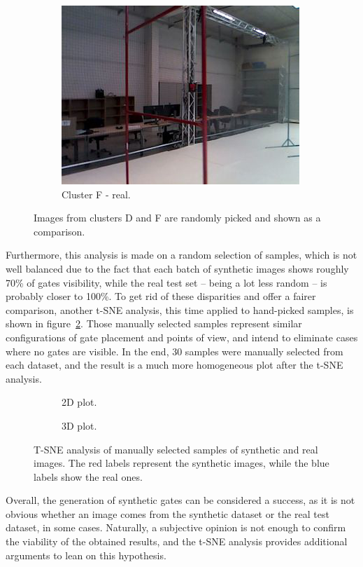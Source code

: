 \begin{figure}[h!]
\begin{subfigure}{0.32\textwidth}
      \includegraphics[width=\textwidth]{figure/tsne_random/F/6.png}
      \caption{Cluster F - real.}
   \end{subfigure}
   \caption[Synthetic versus real images comparison]{Images from clusters D and
   F are randomly picked and shown as a comparison.}
   \label{fig:clustering}
\end{figure}

Furthermore, this analysis is made on a random selection of samples, which is
not well balanced due to the fact that each batch of synthetic images shows
roughly 70\% of gates visibility, while the real test set -- being a lot less
random -- is probably closer to 100\%. To get rid of these disparities and
offer a fairer comparison, another t-SNE analysis, this time applied to
hand-picked samples, is shown in figure~\ref{fig:tsne-manual}. Those manually
selected samples represent similar configurations of gate placement and
points of view, and intend to eliminate cases where no gates are visible. In
the end, 30 samples were manually selected from each dataset, and the result is
a much more homogeneous plot after the t-SNE analysis.

\begin{figure}[h!]
	\centering
	\begin{subfigure}[h]{0.45\textwidth}
		\scalebox{0.4}{
			
		}
		\caption{2D plot.}
	\end{subfigure}
	\begin{subfigure}[h]{0.45\textwidth}
		\scalebox{0.4}{
			
		}
		\caption{3D plot.}
	\end{subfigure}
	\caption[T-SNE analysis of hand-picked samples.]{T-SNE analysis of
	manually selected samples of synthetic and real images. The red labels
	represent the synthetic images, while the blue labels show the real ones.}
	\label{fig:tsne-manual}
\end{figure}

Overall, the generation of synthetic gates can be considered a success, as
it is not obvious whether an image comes from the synthetic dataset or the real
test dataset, in some cases. Naturally, a subjective opinion is not enough to
confirm the viability of the obtained results, and the t-SNE analysis provides
additional arguments to lean on this hypothesis.
\clearpage
